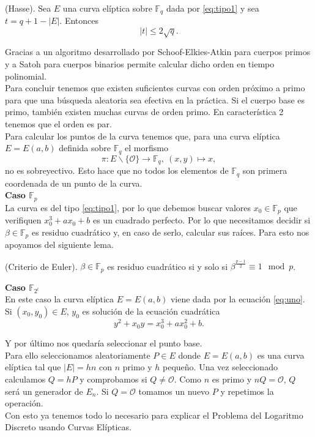 \begin{teorema}
	(Hasse). Sea $E$ una curva elíptica sobre $\mathbb{F}_q$ dada por \eqref{eq:tipo1} y sea $t=q+1-|E|$. Entonces
	$$
		|t|\leq2\sqrt{q}.
	$$
\end{teorema}
Gracias a un algoritmo desarrollado por Schoof-Elkies-Atkin para cuerpos primos y a Satoh para cuerpos binarios permite calcular dicho orden en tiempo polinomial.\\
Para concluir tenemos que existen suficientes curvas con orden próximo a primo para que una búsqueda aleatoria sea efectiva en la práctica. Si el cuerpo base es primo, también existen muchas curvas de orden primo. En característica 2 tenemos que el orden es par.\\

Para calcular los puntos de la curva tenemos que, para una curva elíptica $E=E(a,b)$ definida sobre $\mathbb{F}_q$ el morfismo
$$
	\pi:E\backslash\{\mathcal{O}\}\rightarrow\mathbb{F}_q,\: (x,y)\mapsto x,
$$
no es sobreyectivo. Esto hace que no todos los elementos de $\mathbb{F}_q$ son primera coordenada de un punto de la curva.\\

\textbf{Caso $\mathbb{F}_p$}\\
La curva es del tipo \eqref{eq:tipo1}, por lo que debemos buscar valores $x_0\in \mathbb{F}_p$ que verifiquen $x_0^3+ax_0+b$ es un cuadrado perfecto. Por lo que necesitamos decidir si $\beta\in\mathbb{F}_p$ es residuo cuadrático y, en caso de serlo, calcular sus raíces. Para esto nos apoyamos del siguiente lema. 
\begin{lema}
		(Criterio de Euler). $\beta \in \mathbb{F}_p$ es residuo cuadrático si y solo si $\beta^{\frac{p-1}{2}}\equiv 1 \mod p$.
\end{lema}
\textbf{Caso $\mathbb{F}_{2^l}$}\\
En este caso la curva elíptica $E=E(a,b)$ viene dada por la ecuación \eqref{eq:uno}. Si $(x_0,y_0)\in E$, $y_0$ es solución de la ecuación cuadrática
$$
	y^2+x_0y=x_0^3+ax_0^2+b.
$$

Y por último nos quedaría seleccionar el punto base.\\
Para ello seleccionamos aleatoriamente $P\in E$ donde $E=E(a,b)$ es una curva elíptica tal que $|E|=hn$ con $n$ primo y $h$ pequeño. Una vez seleccionado calculamos $Q=hP$ y comprobamos si $Q\neq\mathcal{O}$. Como $n$ es primo y $nQ=\mathcal{O}$, $Q$ será un generador de $E_n$. Si $Q=\mathcal{O}$ tomamos un nuevo $P$ y repetimos la operación.\\
Con esto ya tenemos todo lo necesario para explicar el Problema del Logaritmo Discreto usando Curvas Elípticas.
